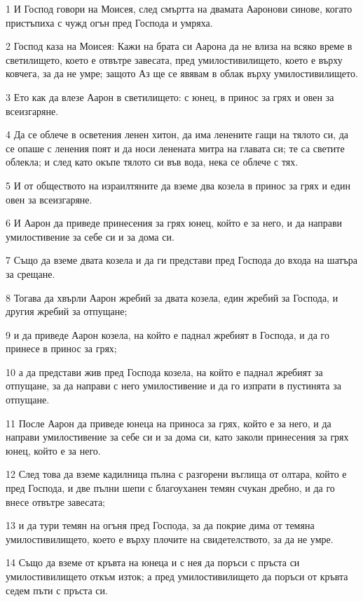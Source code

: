 \par 1 И Господ говори на Моисея, след смъртта на двамата Ааронови синове, когато пристъпиха с чужд огън пред Господа и умряха.
\par 2 Господ каза на Моисея: Кажи на брата си Аарона да не влиза на всяко време в светилището, което е отвътре завесата, пред умилостивилището, което е върху ковчега, за да не умре; защото Аз ще се явявам в облак върху умилостивилището.
\par 3 Ето как да влезе Аарон в светилището: с юнец, в принос за грях и овен за всеизгаряне.
\par 4 Да се облече в осветения ленен хитон, да има ленените гащи на тялото си, да се опаше с ленения поят и да носи ленената митра на главата си; те са светите облекла; и след като окъпе тялото си във вода, нека се облече с тях.
\par 5 И от обществото на израилтяните да вземе два козела в принос за грях и един овен за всеизгаряне.
\par 6 И Аарон да приведе принесения за грях юнец, който е за него, и да направи умилостивение за себе си и за дома си.
\par 7 Също да вземе двата козела и да ги представи пред Господа до входа на шатъра за срещане.
\par 8 Тогава да хвърли Аарон жребий за двата козела, един жребий за Господа, и другия жребий за отпущане;
\par 9 и да приведе Аарон козела, на който е паднал жребият в Господа, и да го принесе в принос за грях;
\par 10 а да представи жив пред Господа козела, на който е паднал жребият за отпущане, за да направи с него умилостивение и да го изпрати в пустинята за отпущане.
\par 11 После Аарон да приведе юнеца на приноса за грях, който е за него, и да направи умилостивение за себе си и за дома си, като заколи принесения за грях юнец, който е за него.
\par 12 След това да вземе кадилница пълна с разгорени въглища от олтара, който е пред Господа, и две пълни шепи с благоуханен темян счукан дребно, и да го внесе отвътре завесата;
\par 13 и да тури темян на огъня пред Господа, за да покрие дима от темяна умилостивилището, което е върху плочите на свидетелството, за да не умре.
\par 14 Също да вземе от кръвта на юнеца и с нея да поръси с пръста си умилостивилището откъм изток; а пред умилостивилището да поръси от кръвта седем пъти с пръста си.
